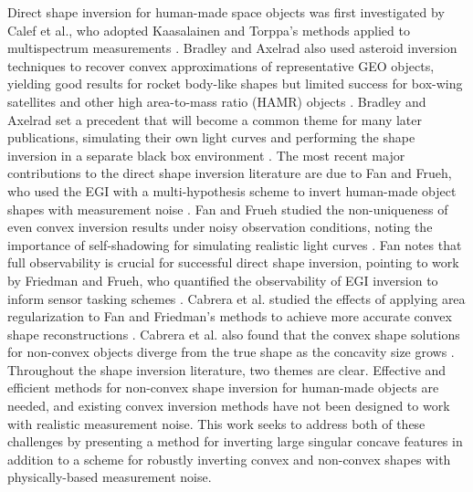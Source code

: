 Direct shape inversion for human-made space objects was first investigated by Calef et al., who adopted Kaasalainen and Torppa's methods applied to multispectrum measurements \cite{calef2006photometric}. Bradley and Axelrad also used asteroid inversion techniques to recover convex approximations of representative GEO objects, yielding good results for rocket body-like shapes but limited success for box-wing satellites and other high area-to-mass ratio (HAMR) objects \cite{bradley2014}. Bradley and Axelrad set a precedent that will become a common theme for many later publications, simulating their own light curves and performing the shape inversion in a separate black box environment \cite{bradley2014}. The most recent major contributions to the direct shape inversion literature are due to Fan and Frueh, who used the EGI with a multi-hypothesis scheme to invert human-made object shapes with measurement noise \cite{fan2019, fan2020thesis, fan2021}. Fan and Frueh studied the non-uniqueness of even convex inversion results under noisy observation conditions, noting the importance of self-shadowing for simulating realistic light curves \cite{fan2020thesis}. Fan notes that full observability is crucial for successful direct shape inversion, pointing to work by Friedman and Frueh, who quantified the observability of EGI inversion to inform sensor tasking schemes \cite{friedman2020, friedman2022}. Cabrera et al. studied the effects of applying area regularization to Fan and Friedman's methods to achieve more accurate convex shape reconstructions \cite{cabrera2021}. Cabrera et al. also found that the convex shape solutions for non-convex objects diverge from the true shape as the concavity size grows \cite{cabrera2021}. Throughout the shape inversion literature, two themes are clear. Effective and efficient methods for non-convex shape inversion for human-made objects are needed, and existing convex inversion methods have not been designed to work with realistic measurement noise. This work seeks to address both of these challenges by presenting a method for inverting large singular concave features in addition to a scheme for robustly inverting convex and non-convex shapes with physically-based measurement noise.


